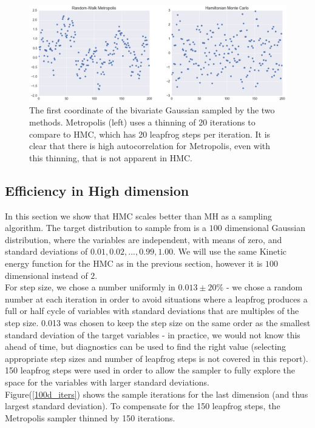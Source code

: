 \documentclass{article}
\numberwithin{equation}{section}
\begin{document}
\begin{figure}[H]
\centering
  \includegraphics[width=1\linewidth]{MH_HMC_single_position.png}
  \caption{The first coordinate of the bivariate Gaussian sampled by the two methods. Metropolis (left) uses a thinning of 20 iterations to compare to HMC, which has 20 leapfrog steps per iteration. It is clear that there is high autocorrelation for Metropolis, even with this thinning, that is not apparent in HMC.}
\label{Fig:4}
\end{figure}

\subsection{Efficiency in High dimension}
In this section we show that HMC scales better than MH as a sampling algorithm. The target distribution to sample from is a $100$ dimensional Gaussian distribution, where the variables are independent, with means of zero, and standard deviations of $0.01,0.02,...,0.99,1.00$. We will use the same Kinetic energy function for the HMC as in the previous section, however it is $100$ dimensional instead of $2$.\\

For step size, we chose a number uniformly in $0.013 \pm 20\%$ - we chose a random number at each iteration in order to avoid situations where a leapfrog produces a full or half cycle of variables with standard deviations that are multiples of the step size. 0.013 was chosen to keep the step size on the same order as the smallest standard deviation of the target variables - in practice, we would not know this ahead of time, but diagnostics can be used to find the right value (selecting appropriate step sizes and number of leapfrog steps is not covered in this report). 150 leapfrog steps were used in order to allow the sampler to fully explore the space for the variables with larger standard deviations.\\

Figure(\ref{100d_iters}) shows the sample iterations for the last dimension (and thus largest standard deviation). To compensate for the 150 leapfrog steps, the Metropolis sampler thinned by 150 iterations.
\end{document}
